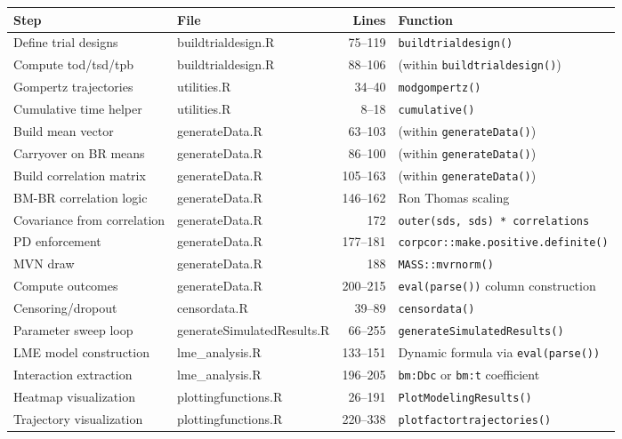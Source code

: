 \documentclass[11pt]{article}
\begin{document}
\begin{table}[h]
\centering
\small
\begin{tabular}{llrl}
\toprule
Step & File & Lines & Function \\
\midrule
Define trial designs & buildtrialdesign.R & 75--119 & \texttt{buildtrialdesign()} \\
Compute tod/tsd/tpb & buildtrialdesign.R & 88--106 & (within \texttt{buildtrialdesign()}) \\
Gompertz trajectories & utilities.R & 34--40 & \texttt{modgompertz()} \\
Cumulative time helper & utilities.R & 8--18 & \texttt{cumulative()} \\
Build mean vector & generateData.R & 63--103 & (within \texttt{generateData()}) \\
Carryover on BR means & generateData.R & 86--100 & (within \texttt{generateData()}) \\
Build correlation matrix & generateData.R & 105--163 & (within \texttt{generateData()}) \\
BM-BR correlation logic & generateData.R & 146--162 & Ron Thomas scaling \\
Covariance from correlation & generateData.R & 172 & \texttt{outer(sds, sds) * correlations} \\
PD enforcement & generateData.R & 177--181 & \texttt{corpcor::make.positive.definite()} \\
MVN draw & generateData.R & 188 & \texttt{MASS::mvrnorm()} \\
Compute outcomes & generateData.R & 200--215 & \texttt{eval(parse())} column construction \\
Censoring/dropout & censordata.R & 39--89 & \texttt{censordata()} \\
Parameter sweep loop & generateSimulatedResults.R & 66--255 & \texttt{generateSimulatedResults()} \\
LME model construction & lme\_analysis.R & 133--151 & Dynamic formula via \texttt{eval(parse())} \\
Interaction extraction & lme\_analysis.R & 196--205 & \texttt{bm:Dbc} or \texttt{bm:t} coefficient \\
Heatmap visualization & plottingfunctions.R & 26--191 & \texttt{PlotModelingResults()} \\
Trajectory visualization & plottingfunctions.R & 220--338 & \texttt{plotfactortrajectories()} \\
\bottomrule
\end{tabular}
\end{table}
\end{document}
